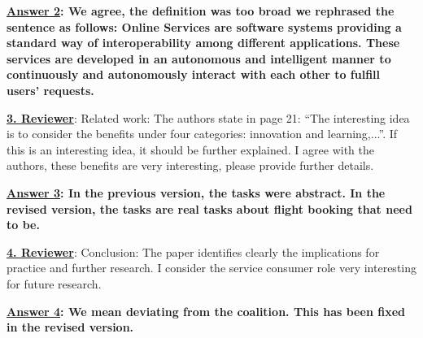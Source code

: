 \documentclass[times, 12pt,a4paper]{article}
\begin{document}
\vspace{0.2cm}\textbf{\underline{Answer 2}: We agree, the definition was too broad we rephrased
the sentence as follows: Online Services are software systems providing a standard way of
interoperability among different applications. These services are developed
 in an autonomous and intelligent manner to continuously and autonomously interact with each other to
fulfill users' requests.}

\vspace{0.5cm} \textbf{\underline{3. Reviewer}}: Related work: The authors state in page 21: ``The interesting idea is to consider the benefits under four categories: innovation and learning,...''. If this is an interesting idea, it should be further explained. I agree with the authors, these benefits are very interesting, please provide further details.

\vspace{0.2cm}\textbf{\underline{Answer 3}: In the previous
version, the tasks were abstract. In the revised version, the
tasks are real tasks about flight booking that need to be.}


\vspace{0.5cm} \textbf{\underline{4. Reviewer}}:  Conclusion: The paper identifies clearly the implications for practice and further research. I consider the service consumer role very interesting for future research.

\vspace{0.2cm}\textbf{\underline{Answer 4}: We mean deviating from
the coalition. This has been fixed in the revised version.}
\end{document}
